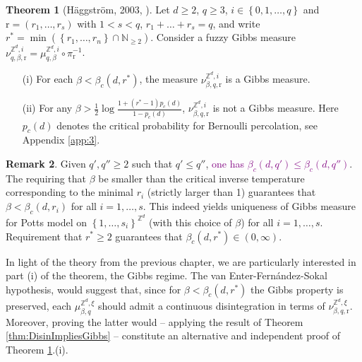 \documentclass[12pt]{article}
\newcommand{\N}{\mathbb{N}}
\renewcommand{\r}{\mathrm{r}}
\newcommand{\Z}{\mathbb{Z}}
\newcommand{\set}[1]{\left\{#1\right\}}
\newcommand{\1}{\mathbbm{1}}
\newcommand{\5}{\vspace{0.5cm}}
\theoremstyle{definition}
\newtheorem{thm}{Theorem}[section]
\newtheorem{rem}[thm]{Remark}
\begin{document}
\begin{thm}[H\"aggstr\"om, 2003, \cite{Hag}]\label{Haggstrom}
Let $d\geq 2$, $q\geq 3$, $i\in\set{0,1,\ldots,q}$ and $\r=(r_1,\ldots,r_s)$ with $1<s<q$, $r_1+\ldots+r_s=q$, and write $r^*=\min(\set{r_1,\ldots,r_n}\cap\N_{\geq 2})$. Consider a fuzzy Gibbs measure $\nu_{q,\beta,\r}^{\Z^d,i}=\mu_{q,\beta}^{\Z^d,i}\circ\pi_{\r}^{-1}$.
\begin{itemize}
	\item[(i)] For each $\beta<\beta_c(d,r^*)$, the measure $\nu_{\beta,q,\r}^{\Z^d,i}$ is a Gibbs measure.
	\item[(ii)] For any $\beta>\frac{1}{2}\log\frac{1+(r^*-1)p_c(d)}{1-p_c(d)}$, $\nu_{\beta,q,\r}^{\Z^d,i}$ is not a Gibbs measure. Here $p_c(d)$ denotes the critical probability for Bernoulli percolation, see Appendix \ref{app:3}.
\end{itemize}
\end{thm}

\begin{rem}
Given $q',q''\geq 2$ such that $q'\leq q''$, \textcolor{purple}{one has $\beta_c(d,q')\leq\beta_c(d,q'')$}. The requiring that $\beta$ be smaller than the critical inverse temperature corresponding to the minimal $r_i$ (strictly larger than 1) guarantees that $\beta<\beta_c(d,r_i)$ for all $i=1,\ldots,s$. This indeed yields uniqueness of Gibbs measure for Potts model on $\set{1,\ldots,s_i}^{\Z^d}$ (with this choice of $\beta$) for all $i=1,\ldots,s$. Requirement that $r^*\geq 2$ guarantees that $\beta_c(d,r^*)\in(0,\infty)$.
\end{rem}

In light of the theory from the previous chapter, we are particularly interested in part (i) of the theorem, the Gibbs regime. The van Enter-Fern\'andez-Sokal hypothesis, would suggest that, since for $\beta<\beta_c(d,r^*)$ the Gibbs property is preserved, each $\mu_{\beta,q}^{\Z^d,\xi}$ should admit a continuous disintegration in terms of $\nu_{\beta,q,\r}^{\Z^d,\xi}$. Moreover, proving the latter would -- applying the result of Theorem \ref{thm:DisinImpliesGibbs} -- constitute an alternative and independent proof of Theorem \ref{Haggstrom}.(i). \\
\end{document}
